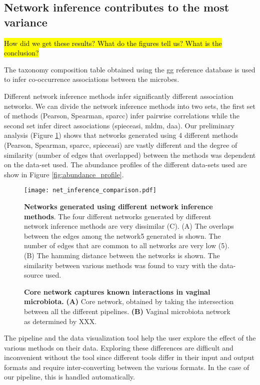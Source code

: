   \FloatBarrier

  \subsection*{Network inference contributes to the most variance}

  \hl{How did we get these results? What do the figures tell us? What is the conclusion?}

  The taxonomy composition table obtained using the \ac{gg} reference database is used to infer co-occurrence associations between the microbes.

  Different network inference methods infer significantly different association networks.
  We can divide the network inference methods into two sets, the first set of methods (Pearson, Spearman, \ac{sparcc}) infer pairwise correlations while the second set infer direct associations (\ac{spieceasi}, \ac{mldm}, \ac{daa}).
  Our preliminary analysis (Figure \ref{fig:network_comparison}) shows that networks generated using 4 different methods (Pearson, Spearman, \ac{sparcc}, \ac{spieceasi}) are vastly different and the degree of similarity (number of edges that overlapped) between the methods was dependent on the data-set used.
  The abundance profiles of the different data-sets used are show in Figure \ref{fig:abundance_profile}.

  \begin{figure}[h]
    \centering
    \texttt{[image: net\_inference\_comparison.pdf]}
    \caption{
      \textbf{Networks generated using different network inference methods}.
      The four different networks generated by different network inference methods are very dissimilar (C).
      (A) The overlaps between the edges among the network5 generated is shown. The number of edges that are common to all networks are very low (5).
      (B) The hamming distance between the networks is shown. The similarity between various methods was found to vary with the data-source used.
    }
    \label{fig:network_comparison}
  \end{figure}

  \begin{figure}[h]
    \centering
    \caption{\textbf{Core network captures known interactions in vaginal microbiota.} \textbf{(A)} Core network, obtained by taking the intersection between all the different pipelines. \textbf{(B)} Vaginal microbiota network as determined by XXX.}
    \label{fig:real_network}
  \end{figure}

  The pipeline and the data visualization tool help the user explore the effect of the various methods on their data.
  Exploring these differences are difficult and inconvenient without the tool since different tools differ in their input and output formats and require inter-converting between the various formats.
  In the case of our pipeline, this is handled automatically.
